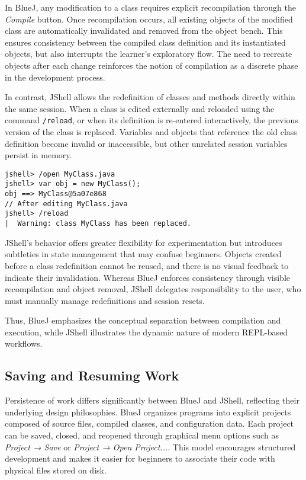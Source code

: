\documentclass{article}
\begin{document}
In BlueJ, any modification to a class requires explicit recompilation through the \textit{Compile} button. Once recompilation occurs, all existing objects of the modified class are automatically invalidated and removed from the object bench. This ensures consistency between the compiled class definition and its instantiated objects, but also interrupts the learner’s exploratory flow. The need to recreate objects after each change reinforces the notion of compilation as a discrete phase in the development process.

In contrast, JShell allows the redefinition of classes and methods directly within the same session. When a class is edited externally and reloaded using the command \texttt{/reload}, or when its definition is re-entered interactively, the previous version of the class is replaced. Variables and objects that reference the old class definition become invalid or inaccessible, but other unrelated session variables persist in memory.

\begin{lstlisting}
jshell> /open MyClass.java
jshell> var obj = new MyClass();
obj ==> MyClass@5a07e868
// After editing MyClass.java
jshell> /reload
|  Warning: class MyClass has been replaced.
\end{lstlisting}

JShell’s behavior offers greater flexibility for experimentation but introduces subtleties in state management that may confuse beginners. Objects created before a class redefinition cannot be reused, and there is no visual feedback to indicate their invalidation. Whereas BlueJ enforces consistency through visible recompilation and object removal, JShell delegates responsibility to the user, who must manually manage redefinitions and session resets.

Thus, BlueJ emphasizes the conceptual separation between compilation and execution, while JShell illustrates the dynamic nature of modern REPL-based workflows.

 
\subsection{Saving and Resuming Work}

Persistence of work differs significantly between BlueJ and JShell, reflecting their underlying design philosophies. BlueJ organizes programs into explicit projects composed of source files, compiled classes, and configuration data. Each project can be saved, closed, and reopened through graphical menu options such as \textit{Project → Save} or \textit{Project → Open Project...}. This model encourages structured development and makes it easier for beginners to associate their code with physical files stored on disk.
\end{document}

